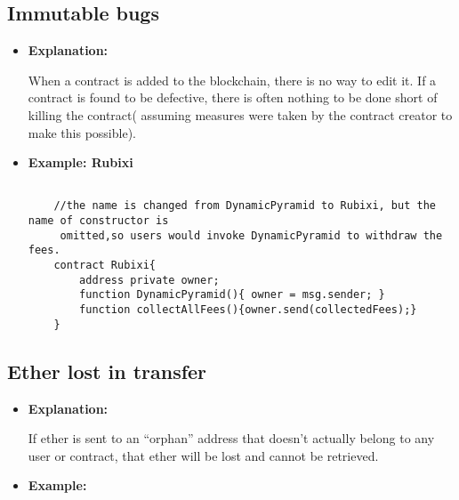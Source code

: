 \documentclass{llncs}
\begin{document}
\subsection{Immutable bugs}
\begin{itemize}
\item \textbf{Explanation:} 

When a contract is added to the blockchain, there is no way to edit it. If a contract is found to be defective, there is often nothing to be done short of killing the contract( assuming measures were taken by the contract creator to make this possible).

\item \textbf{Example: Rubixi}

	\begin{minipage}{.5\textwidth} 
	{\scriptsize
	\begin{verbatim}
	
	//the name is changed from DynamicPyramid to Rubixi, but the name of constructor is
	 omitted,so users would invoke DynamicPyramid to withdraw the fees.
	contract Rubixi{
	    address private owner;
	    function DynamicPyramid(){ owner = msg.sender; }
	    function collectAllFees(){owner.send(collectedFees);}
	}

	\end{verbatim} }
	\end{minipage}	

\end{itemize}

\subsection{Ether lost in transfer}
\begin{itemize}
\item \textbf{Explanation:} 

If ether is sent to an “orphan” address that doesn’t actually belong to any user or contract, that ether will be lost and cannot be retrieved.

\item \textbf{Example:}

\end{itemize}
\end{document}
